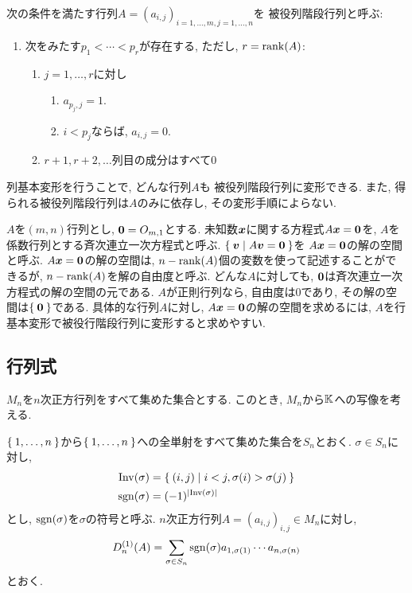 次の条件を満たす行列$A=(a_{i,j})_{i=1,\ldots,m,j=1,\ldots,n}$を
被役列階段行列と呼ぶ:
\begin{enumerate}
\item 次をみたす$p_1<\cdots <p_r$が存在する, ただし, $r=\operatorname{rank}(A)$:
\begin{enumerate}
\item $j=1,\ldots,r$に対し
\begin{enumerate}
\item $a_{p_j,j}=1$.
\item $i<p_j$ならば, $a_{i,j}=0$.
\end{enumerate}
\item $r+1,r+2,\ldots$列目の成分はすべて$0$
\end{enumerate}
\end{enumerate}
列基本変形を行うことで,
どんな行列$A$も
被役列階段行列に変形できる.
また,
得られる被役列階段行列は$A$のみに依存し,
その変形手順によらない.



$A$を$(m,n)$行列とし,
$\boldsymbol{0}=O_{m,1}$とする.
未知数$\boldsymbol{x}$に関する方程式$A\boldsymbol{x}=\boldsymbol{0}$を,
$A$を係数行列とする斉次連立一次方程式と呼ぶ.
$\Set{\boldsymbol{v}|A\boldsymbol{v}=\boldsymbol{0}}$を
$A\boldsymbol{x}=\boldsymbol{0}$の解の空間と呼ぶ.
$A\boldsymbol{x}=\boldsymbol{0}$の解の空間は,
$n-\operatorname{rank}(A)$個の変数を使って記述することができるが,
$n-\operatorname{rank}(A)$を解の自由度と呼ぶ.
どんな$A$に対しても,
$\boldsymbol{0}$は斉次連立一次方程式の解の空間の元である.
$A$が正則行列なら, 自由度は$0$であり,
その解の空間は$\Set{\boldsymbol{0}}$である.
具体的な行列$A$に対し,
$A\boldsymbol{x}=\boldsymbol{0}$の解の空間を求めるには,
$A$を行基本変形で被役行階段行列に変形すると求めやすい.


\subsection{行列式}
$M_n$を$n$次正方行列をすべて集めた集合とする.
このとき, $M_n$から$\mathbb{K}$への写像を考える.

$\Set{1,\ldots,n}$から$\Set{1,\ldots,n}$への全単射をすべて集めた集合を$S_n$とおく.
$\sigma\in S_n$に対し,
\begin{align*}
\operatorname{Inv}(\sigma)&=\Set{(i,j)|i<j, \sigma(i)>\sigma(j)}\\
\operatorname{sgn}(\sigma)&=(-1)^{\left|\operatorname{Inv}(\sigma)\right|}
\end{align*}
とし, $\operatorname{sgn}(\sigma)$を$\sigma$の符号と呼ぶ.
$n$次正方行列$A=(a_{i,j})_{i,j}\in M_n$に対し,
\begin{align*}
D_n^{(1)}(A)=\sum_{\sigma\in S_n} \operatorname{sgn}(\sigma)a_{1,\sigma(1)}\cdots a_{n,\sigma(n)}
\end{align*}
とおく.

